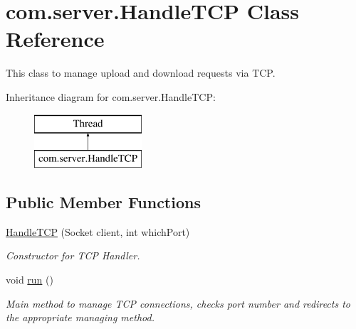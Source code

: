 \hypertarget{classcom_1_1server_1_1HandleTCP}{\section{com.\-server.\-Handle\-T\-C\-P Class Reference}
\label{classcom_1_1server_1_1HandleTCP}
}


This class to manage upload and download requests via T\-C\-P.  


Inheritance diagram for com.\-server.\-Handle\-T\-C\-P\-:\begin{figure}[H]
\begin{center}
\leavevmode
\includegraphics[height=2.000000cm]{classcom_1_1server_1_1HandleTCP}
\end{center}
\end{figure}
\subsection*{Public Member Functions}
\begin{DoxyCompactItemize}
\item 
\hyperlink{classcom_1_1server_1_1HandleTCP_ad94afba7e2974794a5f44015e1c46a4d}{Handle\-T\-C\-P} (Socket client, int which\-Port)
\begin{DoxyCompactList}\small\item\em Constructor for T\-C\-P Handler. \end{DoxyCompactList}\item 
\hypertarget{classcom_1_1server_1_1HandleTCP_a695e48bf0df4e770e89fc8cb1b7a8511}{void \hyperlink{classcom_1_1server_1_1HandleTCP_a695e48bf0df4e770e89fc8cb1b7a8511}{run} ()}\label{classcom_1_1server_1_1HandleTCP_a695e48bf0df4e770e89fc8cb1b7a8511}

\begin{DoxyCompactList}\small\item\em Main method to manage T\-C\-P connections, checks port number and redirects to the appropriate managing method. \end{DoxyCompactList}\end{DoxyCompactItemize}

